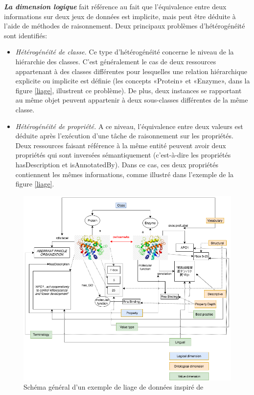 \textbf{\textit{La dimension logique}} fait référence au fait que l'équivalence entre deux informations sur deux jeux de données est implicite, mais peut être déduite à l'aide de méthodes de raisonnement. Deux principaux problèmes d’hétérogénéité sont identifiés:\\
\begin{itemize}
\item \textit{Hétérogénéité de classe.} Ce type d'hétérogénéité concerne le niveau de la hiérarchie des classes. C'est généralement le cas de deux ressources appartenant à des classes différentes pour lesquelles une relation hiérarchique explicite ou implicite est définie (les concepts «Protein» et «Enzyme», dans la figure  \ref{liage}, illustrent ce problème). De plus, deux instances se rapportant au même objet peuvent appartenir à deux sous-classes différentes de la même classe.\\
\item \textit{Hétérogénéité de propriété.} A ce niveau, l'équivalence entre deux valeurs est déduite après l'exécution d'une tâche de raisonnement sur les propriétés. Deux ressources faisant référence à la même entité peuvent avoir deux propriétés qui sont inversées sémantiquement (c’est-à-dire les propriétés hasDescription et isAnnotatedBy). Dans ce cas, ces deux propriétés contiennent les mêmes informations, comme illustré dans l'exemple de la figure \ref{liage}.\\
\end{itemize}

\begin{figure}[!ht]
\begin{center}
	\includegraphics[width=1\textwidth]{Figures/exempleLiage.png}
\end{center}
\caption{\label{exempleL} Schéma général d'un exemple de liage de données inspiré de ~\cite{achichi2018} }
\end{figure}

